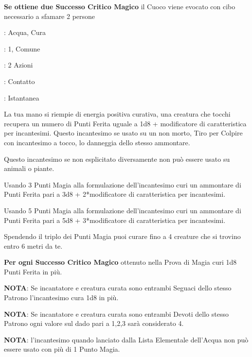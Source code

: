 \begin{multicols}{2}
\textbf{Se ottiene due Successo Critico Magico} il Cuoco viene evocato con cibo necessario a sfamare 2 persone

\noindent\colorbox{OBSSgold!10}{
\begin{minipage}{0.95\linewidth}
\begin{description}[noitemsep, topsep=0pt, parsep=0pt, partopsep=0pt, leftmargin=0cm, labelwidth=1.3cm]
	\item[\textbf{Lista}]: Acqua, Cura
	\item[\textbf{Livello}]: 1, Comune
	\item[\textbf{Lancio}]: 2 Azioni
	\item[\textbf{Gittata}]: Contatto
	\item[\textbf{Durata}]: Istantanea
\end{description}
\end{minipage}}\smallskip

La tua mano si riempie di energia positiva curativa, una creatura che tocchi recupera un numero di Punti Ferita uguale a 1d8 + modificatore di caratteristica per incantesimi. Questo incantesimo se usato su un non morto, Tiro per Colpire con incantesimo a tocco, lo danneggia dello stesso ammontare.

Questo incantesimo se non esplicitato diversamente non può essere usato su animali o piante.

Usando 3 Punti Magia alla formulazione dell'incantesimo curi un ammontare di Punti Ferita pari a 3d8 + 2*modificatore di caratteristica per incantesimi.

Usando 5 Punti Magia alla formulazione dell'incantesimo curi un ammontare di Punti Ferita pari a 5d8 + 3*modificatore di caratteristica per incantesimi.

Spendendo il triplo dei Punti Magia puoi curare fino a 4 creature che si trovino entro 6 metri da te.

\textbf{Per ogni Successo Critico Magico} ottenuto nella Prova di Magia curi 1d8 Punti Ferita in più.

\textbf{NOTA}: Se incantatore e creatura curata sono entrambi Seguaci dello stesso Patrono l'incantesimo cura 1d8 in più.

\textbf{NOTA}: Se incantatore e creatura curata sono entrambi Devoti dello stesso Patrono ogni valore sul dado pari a 1,2,3 sarà considerato 4.

\textbf{NOTA}: l'incantesimo quando lanciato dalla Lista Elementale dell'Acqua non può essere usato con più di 1 Punto Magia.


\end{multicols}

